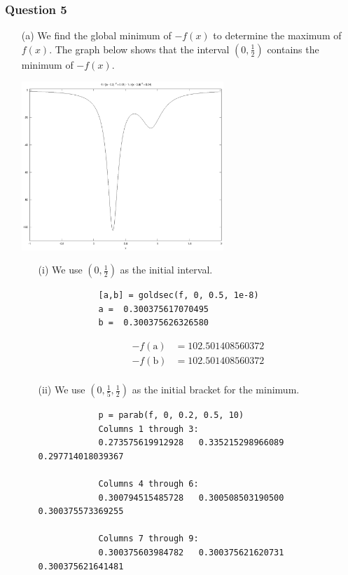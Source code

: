 \documentclass[11pt,a4paper]{article}
\begin{document}
\subsubsection*{Question 5}
\begin{enumerate}
	\item[(a)] We find the global minimum of $-f(x)$ to determine the maximum of $f(x)$. The graph below shows that the interval $\left(0,\frac{1}{2}\right)$ contains the minimum of $-f(x)$.
	\begin{center}
		\includegraphics[width=0.6\textwidth]{fmin.eps}
	\end{center}
	
	\begin{enumerate}
		\item[(i)] We use $\left(0,\frac{1}{2}\right)$ as the initial interval.
		\begin{verbatim}
			[a,b] = goldsec(f, 0, 0.5, 1e-8)
			a =  0.300375617070495
			b =  0.300375626326580
		\end{verbatim}
		\begin{align*}
			-f({\text{a}})&= 102.501408560372 \\
			-f({\text{b}})&= 102.501408560372 \\
		\end{align*}
		\item[(ii)] We use $\left(0,\frac{1}{5},\frac{1}{2}\right)$ as the initial bracket for the minimum.
		\begin{verbatim}
			p = parab(f, 0, 0.2, 0.5, 10)
			Columns 1 through 3:
			0.273575619912928   0.335215298966089   0.297714018039367

			Columns 4 through 6:
			0.300794515485728   0.300508503190500   0.300375573369255

			Columns 7 through 9:
			0.300375603984782   0.300375621620731   0.300375621641481


\end{verbatim}
\end{enumerate}
\end{enumerate}
\end{document}
